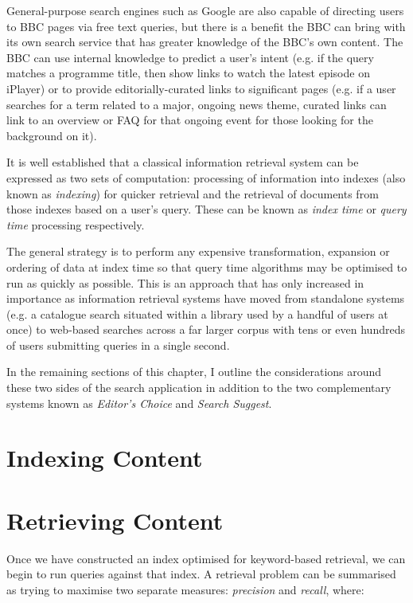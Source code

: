 General-purpose search engines such as Google are also capable of directing
users to BBC pages via free text queries, but there is a benefit the BBC
can bring with its own search service that has greater knowledge of the
BBC's own content. The BBC can use internal knowledge to predict a user's
intent (e.g. if the query matches a programme title, then show links to watch
the latest episode on iPlayer) or to provide editorially-curated
links to significant pages (e.g. if a user searches for a term
related to a major, ongoing news theme, curated links can
link to an overview or FAQ for that ongoing event for those
looking for the background on it).

It is well established that a classical information retrieval system
can be expressed as two sets of computation: processing of information
into indexes (also known as \emph{indexing}) for quicker retrieval
and the retrieval of documents from those indexes based on a user's
query. These can be known as \emph{index time} or \emph{query time}
processing respectively.

The general strategy is to perform
any expensive transformation, expansion or ordering of data
at index time so that query time algorithms may be optimised to
run as quickly as possible. This is an approach that has only
increased in importance as information retrieval systems have moved
from standalone systems (e.g. a catalogue search situated within
a library used by a handful of users at once) to web-based
searches across a far larger corpus with tens or even hundreds of
users submitting queries in a single second.

In the remaining sections of this chapter, I outline the considerations
around these two sides of the search application in addition to the
two complementary systems known as \emph{Editor's Choice} and
\emph{Search Suggest}.

\section{Indexing Content}


\section{Retrieving Content}

Once we have constructed an index optimised for keyword-based retrieval,
we can begin to run queries against that index. A retrieval problem
can be summarised as trying to maximise two separate measures: \emph{precision}
and \emph{recall}, where:

